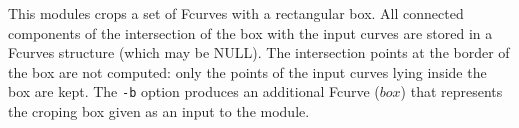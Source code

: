 This modules crops 
a set of Fcurves with a rectangular box. All connected
components of the intersection of the box with the input curves are
stored in a Fcurves structure (which may be NULL). 
The intersection points at the border
of the box are not computed: only the points of the
input curves lying inside the box are kept.
The \verb+-b+ option produces an additional Fcurve ($box$) that represents 
the croping box given as an input to the module.
